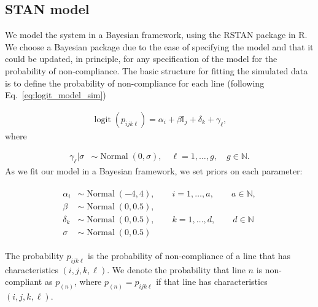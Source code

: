 \documentclass[aoas]{imsart}
\DeclareMathOperator{\logit}{logit}
\DeclareMathOperator{\Normal}{Normal}
\begin{document}
\subsection{STAN model}
We model the system in a Bayesian framework, using the RSTAN package in R. We choose a Bayesian package due to the ease of specifying the model and {that it} could be updated, in principle, for any specification of the model for the probability of non-compliance. The basic structure for fitting the simulated data is to define the probability of non-compliance for each line (following Eq.~\eqref{eq:logit_model_sim})

\begin{align}
\logit(p_{ijk\ell}) = \alpha_{i} + \beta\mathbb{I}_j + \delta_k + \gamma_\ell, \label{eq:logit_model_fit_sim}
\end{align}
where 

\begin{align}
\gamma_\ell | \sigma &\sim \Normal(0, \sigma), \quad  \ell = 1,\ldots, g, \quad  g \in \mathbb{N}.
\end{align}
As we fit our model in a Bayesian framework, we set priors on each parameter:

\begin{align}
\begin{split}
\alpha_i &\sim \Normal(-4, 4), \quad \quad i=1, \ldots, a,\quad \quad  a\in \mathbb{N},\\
\beta &\sim \Normal(0, 0.5),\\
\delta_k &\sim \Normal(0, 0.5),\quad \quad  k = 1,\ldots, d, \quad \quad d \in \mathbb{N}\\
\sigma &\sim \Normal(0, 0.5)
\end{split}
\end{align}

The probability $p_{ijk\ell}$ is the probability of non-compliance of a line that has characteristics $(i,j,k,\ell)$. We denote the probability that line $n$ is non-compliant as $p_{(n)}$, where $p_{(n)} = p_{ijk\ell}$ if that line has characteristics $(i,j,k,\ell)$.
\end{document}
